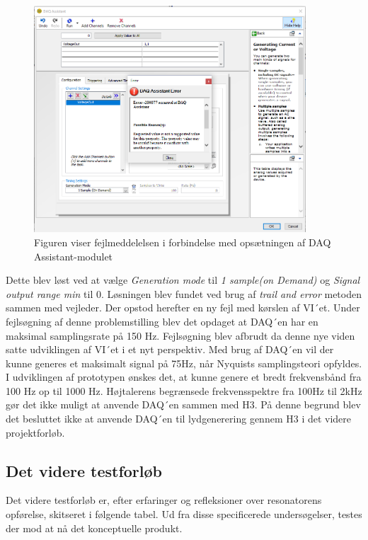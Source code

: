 \begin{figure}[htb]
			\centering
				\includegraphics[width=4in]{FejlDAQAssistant}
				\caption{Figuren viser fejlmeddelelsen i forbindelse med opsætningen af DAQ Assistant-modulet}	
				\label{fig:FejlDAQAssistant}
			\end{figure}
			
			
Dette blev løst ved at vælge \textit{Generation mode} til \textit{1 sample(on Demand)} og \textit{Signal output range min} til 0. Løsningen blev fundet ved brug af \textit{trail and error} metoden sammen med vejleder. Der opstod herefter en ny fejl med kørslen af VI´et. Under fejlsøgning af denne problemstilling blev det opdaget at DAQ´en har en maksimal samplingsrate på 150 Hz. Fejlsøgning blev afbrudt da denne nye viden satte udviklingen af VI´et i et nyt perspektiv. Med brug af DAQ´en vil der kunne generes et maksimalt signal på 75Hz, når Nyquists samplingsteori opfyldes. I udviklingen af prototypen ønskes det, at kunne genere et bredt frekvensbånd fra 100 Hz op til 1000 Hz. Højtalerens begrænsede frekvensspektre fra 100Hz til 2kHz  gør det ikke muligt at anvende DAQ´en sammen med H3. 
På denne begrund blev det besluttet ikke at anvende DAQ´en til lydgenerering gennem H3 i det videre projektforløb. 	

\subsection{Det videre testforløb}
Det videre testforløb er, efter erfaringer og refleksioner over resonatorens opførelse, skitseret i følgende tabel. Ud fra disse specificerede undersøgelser, testes der mod at nå det konceptuelle produkt.  

